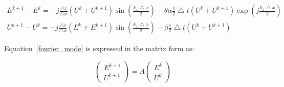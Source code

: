 \begin{equation}
\label{fourier_mode}
\begin{array}{l}
E^{k+1} - E^{k} = -j \frac{\bigtriangleup t}{\bigtriangleup x} (U^{k} + U^{k+1}) \sin \left( \frac{k_x \bigtriangleup x}{2} \right) - \theta \alpha \frac{1}{2} \bigtriangleup t (U^{k} + U^{k+1}) \exp \left( j \frac{k_x \bigtriangleup x}{2} \right) \\
U^{k+1} - U^{k} = -j  \frac{\bigtriangleup t}{\bigtriangleup x} (E^{k} + E^{k+1}) \sin \left( \frac{k_x \bigtriangleup x}{2} \right) - \beta \frac{1}{2} \bigtriangleup t (U^{k} + U^{k+1})
\end{array}
\end{equation}

Equation~\ref{fourier_mode} is expressed in the matrix form as:

\begin{equation}
\begin{pmatrix}
E^{k+1} \\
U^{k+1}
\end{pmatrix} = 
A \begin{pmatrix}
E^{k} \\
U^{k}
\end{pmatrix}
\end{equation}

